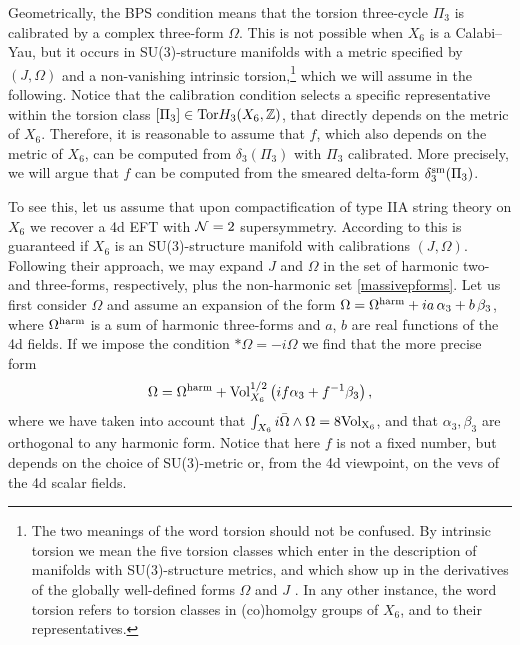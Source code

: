 \documentclass[11pt]{article}
\def\a {\alpha}
\def\b {\beta}
\def\CN {{\cal N}}
\def\be{\begin{equation}}
\def\ee{\end{equation}}
\newcommand{\IZ}{\mathbb{Z}}
\begin{document}
Geometrically, the BPS condition means that the torsion three-cycle $\Pi_3$ is calibrated by a complex three-form $\Omega$. This is not possible when $X_6$ is a Calabi--Yau, but it occurs in SU(3)-structure manifolds with a metric specified by $(J, \Omega)$ and a non-vanishing intrinsic torsion,\footnote{The two meanings of the word torsion should not be confused. By intrinsic torsion we mean the five torsion classes which enter in the description of manifolds with SU(3)-structure metrics, and which show up in the derivatives of the globally well-defined forms $\Omega$ and $J$ \cite{Gray1980TheSC,chiossi2002intrinsic,Hull:1986iu,Strominger:1986uh,LopesCardoso:2002vpf,Gauntlett:2003cy,Grana:2005jc,Koerber:2010bx}. In any other instance, the word torsion refers to torsion classes in (co)homolgy groups of $X_6$, and to their representatives.} which we will assume in the following. Notice that the calibration condition selects a specific representative within the torsion class $[\Pi_3] \in {\rm Tor} H_3(X_6, \IZ)$, that directly depends on the metric of $X_6$. Therefore, it is reasonable to assume that $f$, which also depends on the metric of $X_6$, can be computed from $\delta_3(\Pi_3)$ with $\Pi_3$ calibrated. More precisely, we will argue that $f$ can be computed from the smeared delta-form $\delta_3^{\rm sm}(\Pi_3)$.

To see this, let us assume that upon compactification of type IIA string theory on $X_6$ we recover a 4d EFT with $\CN= 2$ supersymmetry. According to \cite{Grana:2005ny,Kashani-Poor:2006ofe} this is guaranteed if $X_6$ is an SU(3)-structure manifold with calibrations $(J,\Omega)$. Following their approach, we may expand $J$ and $\Omega$ in the set of harmonic two- and three-forms, respectively, plus the non-harmonic set \eqref{massivepforms}. Let us first consider $\Omega$ and assume an expansion of the form $\Omega = \Omega^{\rm harm} + i a \,  \a_3 +  b \, \b_3$, where $\Omega^{\rm harm}$ is a sum of harmonic three-forms and $a$, $b$ are real functions of the 4d fields. If we impose the condition $* \Omega = - i \Omega$ we find that the more precise form 
\be
\Omega = \Omega^{\rm harm} + {\rm Vol}_{X_6}^{1/2} \left(if \a_3 +  f^{-1} \b_3 \right) ,
\ee
where we have taken into account that $\int_{X_6} i \bar{\Omega} \wedge \Omega = 8 {\rm Vol}_{\rm X_6}$, and that $\a_3, \b_3$ are orthogonal to any harmonic form. Notice that here $f$ is not a fixed number, but depends on the choice of SU(3)-metric or, from the 4d viewpoint, on the vevs of the 4d scalar fields. 
\end{document}
